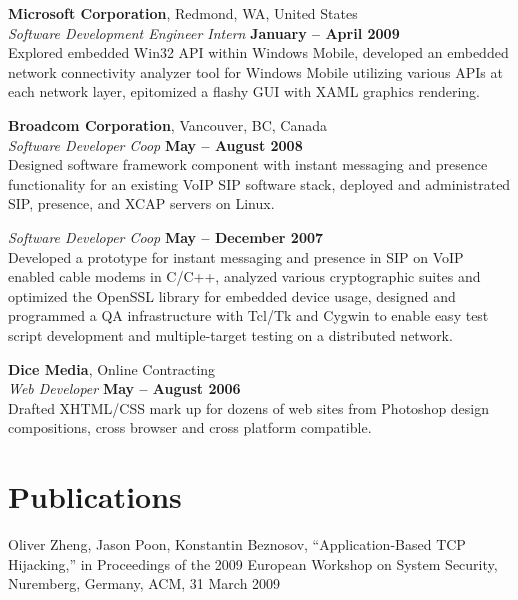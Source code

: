 \documentclass[margin,line]{resume}
\begin{document}
\begin{resume}
    \textbf{Microsoft Corporation}, Redmond, WA, United States \vspace{2mm}\\\vspace{1mm}%
    \textsl{Software Development Engineer Intern} \hfill \textbf{January -- April 2009}\\
    Explored embedded Win32 API within Windows Mobile,
    developed an embedded network connectivity analyzer tool for Windows Mobile utilizing various APIs at each network layer,
    epitomized a flashy GUI with XAML graphics rendering.

    \textbf{Broadcom Corporation}, Vancouver, BC, Canada \vspace{2mm}\\\vspace{1mm}%
    \textsl{Software Developer Coop} \hfill \textbf{May -- August 2008}\\
    Designed software framework component with instant messaging and presence functionality for an existing VoIP SIP software stack,
    deployed and administrated SIP, presence, and XCAP servers on Linux.

    \textsl{Software Developer Coop} \hfill \textbf{May -- December 2007}\\
    Developed a prototype for instant messaging and presence in SIP on VoIP enabled cable modems in C/C++,
    analyzed various cryptographic suites and optimized the OpenSSL library for embedded device usage,
    designed and programmed a QA infrastructure with Tcl/Tk and Cygwin to enable easy test script development and multiple-target testing on a distributed network.

    \textbf{Dice Media}, Online Contracting \vspace{2mm}\\\vspace{1mm}%
    \textsl{Web Developer} \hfill \textbf{May -- August 2006}\\
    Drafted XHTML/CSS mark up for dozens of web sites from Photoshop design compositions, cross browser and cross platform compatible.

    \section{\mysidestyle Publications}
    Oliver Zheng, Jason Poon, Konstantin Beznosov, ``Application-Based TCP Hijacking,'' in Proceedings of the 2009 European Workshop on System Security, Nuremberg, Germany, ACM, 31 March 2009


\end{resume}
\end{document}

